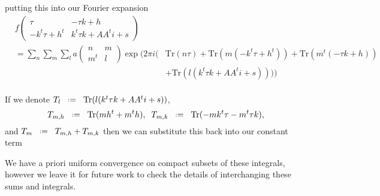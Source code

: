putting this into our Fourier expansion
\begin{align*}
	&f\begin{pmatrix} \tau & -\tau k + h\\ -k^t \tau + h^t & k^t \tau k + A A^t i + s \end{pmatrix} \\
	&= \sum_{n} \sum_{m} \sum_{l} a\begin{pmatrix} n & m\\ m^t & l \end{pmatrix} \exp \Big(2\pi i \big( &\mathrm{Tr} (n\tau) +  \mathrm{Tr} (m(-k^t \tau + h^t )) +  \mathrm{Tr} (m^t(-\tau k + h)) \\ & &  +  \mathrm{Tr} (l( k^t \tau k + A A^t i + s))\big)\Big)  \\
\end{align*}

If we denote \(T_l \defeq \mathrm{Tr} (l( k^t \tau k + A A^t i + s))\),
\[T_{m,h}\defeq \mathrm{Tr}(mh^t + m^th), \;\; T_{m,k} \defeq \mathrm{Tr}(-mk^t\tau - m^t\tau k) , \]
and \(T_m \defeq T_{m,h} + T_{m,k}\) then we can substitute this back into our constant term
\begin{remark}
	We have a priori uniform convergence on compact subsets of these integrals, however we leave it for future work to check the details of interchanging these sums and integrals.
\end{remark}

